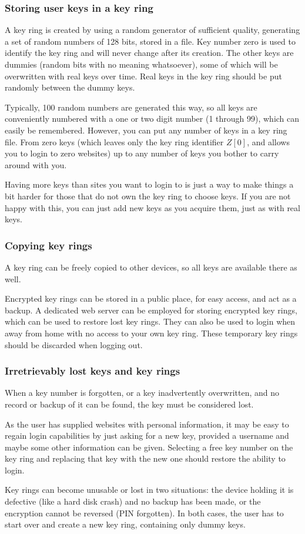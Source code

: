 \subsubsection{Storing user keys in a key ring}
\label{sec:key ring}
A key ring is created by using a random generator of sufficient quality,
generating a set of random numbers of 128 bits,
stored in a file.
Key number zero is used to identify the key ring and will never change after its creation.
The other keys are dummies
(random bits with no meaning whatsoever),
some of which will be overwritten with real keys over time.
Real keys in the key ring should be put randomly between the dummy keys.
\par
Typically,
100 random numbers are generated this way,
so all keys are conveniently numbered with a one or two digit number
(1 through 99),
which can easily be remembered.
However,
you can put any number of keys in a key ring file.
From zero keys
(which leaves only the key ring identifier $Z[0]$,
and allows you to login to zero websites)
up to any number of keys you bother to carry around with you.
\par
Having more keys than sites you want to login to is just a way to make things
a bit harder for those that do not own the key ring to choose keys.
If you are not happy with this,
you can just add new keys as you acquire them,
just as with real keys.

\subsubsection{Copying key rings}
A key ring can be freely copied to other devices, so all keys are available there as well.
\par
Encrypted key rings can be stored in a public place, for easy access, and act as a backup.
A dedicated web server can be employed for storing encrypted key rings,
which can be used to restore lost key rings.
They can also be used to login when away from home with no access to your own key ring.
These temporary key rings should be discarded when logging out.

\subsubsection{Irretrievably lost keys and key rings}
When a key number is forgotten,
or a key inadvertently overwritten,
and no record or backup of it can be found,
the key must be considered lost.
\par
As the user has supplied websites with personal information,
it may be easy to regain login capabilities by just asking for a new key,
provided a username and maybe some other information can be given.
Selecting a free key number on the key ring and replacing that key with the new one should restore the ability to login.
\par
Key rings can become unusable or lost in two situations:
the device holding it is defective
(like a hard disk crash)
and no backup has been made,
or the encryption cannot be reversed
(PIN forgotten).
In both cases,
the user has to start over and create a new key ring,
containing only dummy keys.

